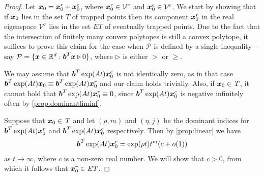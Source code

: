 \begin{proof}

  Let
  $\boldsymbol{x}_{0}=\boldsymbol{x}_{0}^{r}+\boldsymbol{x}_{0}^{c}$,
  where $\boldsymbol{x}_{0}^{r}\in \mathcal{V}^{r}$ and
  $\boldsymbol{x}_{0}^{c}\in \mathcal{V}^{c}$. We start by showing
  that if $\boldsymbol{x}_{0}$ lies in the set $T$ of trapped points
  then its component $\boldsymbol{x}_{0}^{r}$ in the real eigenspace
  $\mathcal{V}^{r}$ lies in the set $\mathit{ET}$ of eventually
  trapped points.
Due to the
fact that the intersection of finitely many convex polytopes is still
a convex polytope, it suffices to prove this claim for the case when
  $\mathcal{P}$ is defined by a single inequality---say
  $\mathcal{P}=\lbrace \boldsymbol{x}\in\mathbb{R}^{d}:
  \boldsymbol{b}^{T}\boldsymbol{x}\triangleright 0\rbrace$, where
  $\triangleright$ is either $>$ or $\geq$.

  We may assume that
  $\boldsymbol{b}^{T} \exp(At) \boldsymbol{x}_{0}^{c}$ is not identically
  zero, as in that case
  $\boldsymbol{b}^{T} \exp(At)\boldsymbol{x}_{0} \equiv
  \boldsymbol{b}^{T} \exp(At)\boldsymbol{x}_{0}^{r}$ and our claim
  holds trivially.
  Also, if $\boldsymbol{x}_{0}\in\mathit{T}$, it cannot hold that
  $\boldsymbol{b}^{T} \exp(At) \boldsymbol{x}_{0}^{r} \equiv 0$, since
  $\boldsymbol{b}^{T} \exp(At) \boldsymbol{x}_{0}^{c}$ is negative
  infinitely often by \cref{prop:dominantliminf}.

  Suppose that $\boldsymbol{x}_{0}\in\mathit{T}$ and let $(\rho,m)$
  and $(\eta,j)$ be the dominant indices for
  $\boldsymbol{b}^{T} \exp(At) \boldsymbol{x}_{0}^{r}$ and
  $\boldsymbol{b}^{T} \exp(At) \boldsymbol{x}_{0}^{c}$ respectively.
Then by \cref{prop:linear} we have
\begin{gather}
\myvector{b}^{T} \exp(At) \myvector{x}_{0}^{r} = \exp(\rho t)t^m (c
  + o(1))
\label{eq:real}
\end{gather}
 as $t \rightarrow \infty$, where $c$ is a non-zero real
number.  We will show that $c>0$, from which it follows  that
$\boldsymbol{x}_{0}^{r} \in \mathit{ET}$.


\end{proof}
